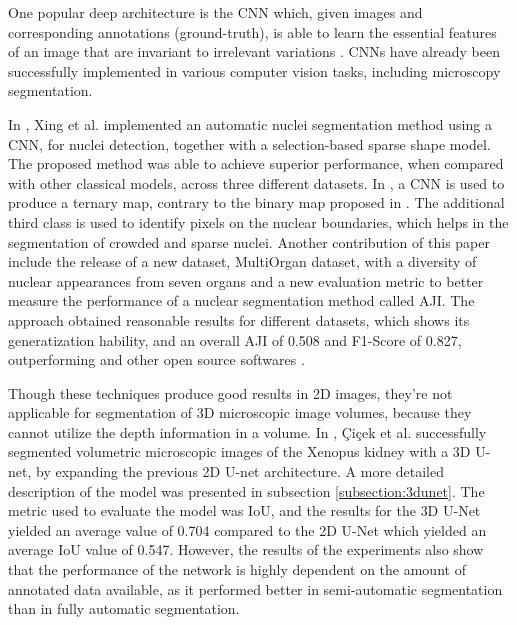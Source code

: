 One popular deep architecture is the \ac{CNN} which, given images and corresponding annotations (ground-truth), is able to learn the essential features of an image that are invariant to irrelevant variations \cite{guide:cnn}. \ac{CNNs} have already been successfully implemented in various computer vision tasks, including microscopy segmentation.

In \cite{CNN2}, Xing et al. implemented an automatic nuclei segmentation method using a \ac{CNN}, for nuclei detection, together with a selection-based sparse shape model. The proposed method was able to achieve superior performance, when compared with other classical models, across three different datasets. In \cite{CNN3}, a \ac{CNN} is used to produce a ternary map, contrary to the binary map proposed in \cite{CNN2}. The additional third class is used to identify pixels on the nuclear boundaries, which helps in the segmentation of crowded and sparse nuclei. Another contribution of this paper include the release of a new dataset, MultiOrgan dataset, with a diversity of nuclear appearances from seven organs and a new evaluation metric to better measure the performance of a nuclear segmentation method called \ac{AJI}. The approach obtained reasonable results for different datasets, which shows its generatization hability, and an overall \ac{AJI} of 0.508 and F1-Score of  0.827, outperforming \cite{CNN2} and other open source softwares \cite{cellprofiler}. 

Though these techniques produce good results in \ac{2D} images, they're not applicable for segmentation of \ac{3D} microscopic image volumes, because they cannot utilize the depth information in a volume. In \cite{Unet:3D}, Çiçek et al. successfully segmented volumetric microscopic images of the Xenopus kidney with a \ac{3D} U-net, by expanding the previous \ac{2D} U-net \cite{Unet:2D} architecture. A more detailed description of the model was presented in subsection \ref{subsection:3dunet}. The metric used to evaluate the model was \ac{IoU}, and the results for the \ac{3D} U-Net yielded an average value of 0.704 compared to the \ac{2D} U-Net which yielded an average \ac{IoU} value of 0.547. However, the results of the experiments also show that the performance of the network is highly dependent on the amount of annotated data available, as it performed better in semi-automatic segmentation than in fully automatic segmentation.


